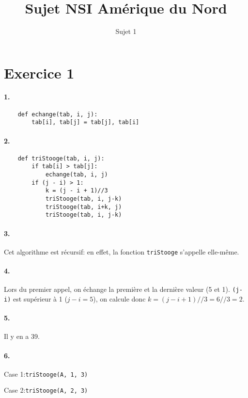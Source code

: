 \documentclass{article}
\title{Sujet NSI Amérique du Nord}
\author{Sujet 1}
\date{}
\begin{document}
\maketitle

\section*{Exercice 1}
\paragraph*{1.}
\begin{verbatim}
    def echange(tab, i, j):
        tab[i], tab[j] = tab[j], tab[i]
\end{verbatim}

\paragraph*{2.}
\begin{verbatim}
    def triStooge(tab, i, j):
        if tab[i] > tab[j]:
            echange(tab, i, j)
        if (j - i) > 1:
            k = (j - i + 1)//3
            triStooge(tab, i, j-k)
            triStooge(tab, i+k, j)
            triStooge(tab, i, j-k)
\end{verbatim}

\paragraph*{3.}
Cet algorithme est récursif\nobreakspace: en effet, la fonction \verb|triStooge| s’appelle elle-même.

\paragraph*{4.}
Lors du premier appel, on échange la première et la dernière valeur (5 et 1).
\verb|(j-i)| est supérieur à 1 ($j-i=5$), on calcule donc $k=(j-i+1)//3 = 6//3 = 2$.

\paragraph*{5.}
Il y en a 39.

\paragraph*{6.}
Case 1\nobreakspace:\verb|triStooge(A, 1, 3)|

Case 2\nobreakspace:\verb|triStooge(A, 2, 3)|
\end{document}
